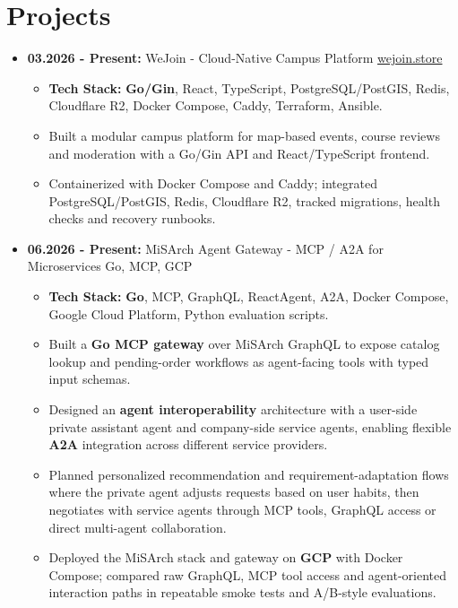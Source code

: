 \documentclass[10pt,a4paper]{article}
\newcommand{\cvright}[1]{\hfill{\normalfont #1}}
\newcommand{\cvproject}[3]{%
  \item \textbf{#1} #2 \cvright{#3}
}
\begin{document}
\section*{Projects}
\begin{itemize}
  \cvproject{03.2026 - Present:}{WeJoin - Cloud-Native Campus Platform}{\href{https://wejoin.store}{wejoin.store}}
    \begin{itemize}
      \item \textbf{Tech Stack:} \textbf{Go/Gin}, React, TypeScript, PostgreSQL/PostGIS, Redis, Cloudflare R2, Docker Compose, Caddy, Terraform, Ansible.
      \item Built a modular campus platform for map-based events, course reviews and moderation with a Go/Gin API and React/TypeScript frontend.
      \item Containerized with Docker Compose and Caddy; integrated PostgreSQL/PostGIS, Redis, Cloudflare R2, tracked migrations, health checks and recovery runbooks.
    \end{itemize}

  \cvproject{06.2026 - Present:}{MiSArch Agent Gateway - MCP / A2A for Microservices}{Go, MCP, GCP}
    \begin{itemize}
      \item \textbf{Tech Stack:} \textbf{Go}, MCP, GraphQL, ReactAgent, A2A, Docker Compose, Google Cloud Platform, Python evaluation scripts.
      \item Built a \textbf{Go MCP gateway} over MiSArch GraphQL to expose catalog lookup and pending-order workflows as agent-facing tools with typed input schemas.
      \item Designed an \textbf{agent interoperability} architecture with a user-side private assistant agent and company-side service agents, enabling flexible \textbf{A2A} integration across different service providers.
      \item Planned personalized recommendation and requirement-adaptation flows where the private agent adjusts requests based on user habits, then negotiates with service agents through MCP tools, GraphQL access or direct multi-agent collaboration.
      \item Deployed the MiSArch stack and gateway on \textbf{GCP} with Docker Compose; compared raw GraphQL, MCP tool access and agent-oriented interaction paths in repeatable smoke tests and A/B-style evaluations.
    \end{itemize}


\end{itemize}
\end{document}
